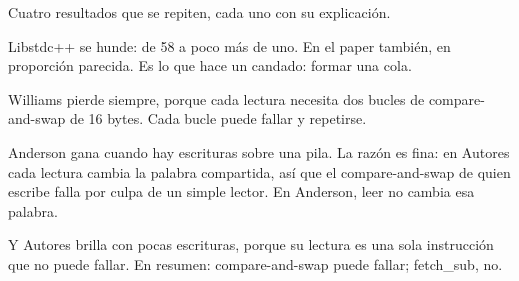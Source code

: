 Cuatro resultados que se repiten, cada uno con su explicación.

Libstdc++ se hunde: de 58 a poco más de uno. En el paper también, en proporción parecida. Es lo que hace un candado: formar una cola.

Williams pierde siempre, porque cada lectura necesita dos bucles de compare-and-swap de 16 bytes. Cada bucle puede fallar y repetirse.

Anderson gana cuando hay escrituras sobre una pila. La razón es fina: en Autores cada lectura cambia la palabra compartida, así que el compare-and-swap de quien escribe falla por culpa de un simple lector. En Anderson, leer no cambia esa palabra.

Y Autores brilla con pocas escrituras, porque su lectura es una sola instrucción que no puede fallar. En resumen: compare-and-swap puede fallar; fetch\_sub, no.
